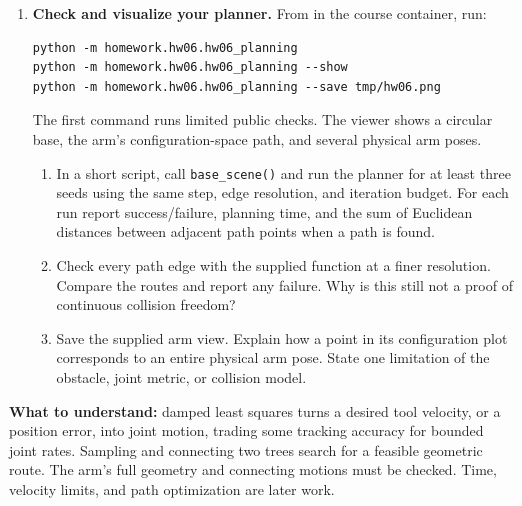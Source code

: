\begin{enumerate}
\item \textbf{Check and visualize your planner.}
From  in the course container, run:
\begin{lstlisting}
python -m homework.hw06.hw06_planning
python -m homework.hw06.hw06_planning --show
python -m homework.hw06.hw06_planning --save tmp/hw06.png
\end{lstlisting}
The first command runs limited public checks. The viewer shows a circular
base, the arm's configuration-space path, and several physical arm poses.
\begin{enumerate}
\item In a short script, call \texttt{base\_scene()} and run the planner for
at least three seeds using the same step, edge resolution, and iteration
budget. For each run report success/failure, planning time, and the sum of
Euclidean distances between adjacent path points when a path is found.
\item Check every path edge with the supplied function at a finer resolution.
Compare the routes and report any failure. Why is this still not a proof of
continuous collision freedom?
\item Save the supplied arm view. Explain how a point in its configuration
plot corresponds to an entire physical arm pose. State one limitation of
the obstacle, joint metric, or collision model.
\end{enumerate}
\end{enumerate}

\textbf{What to understand:} damped least squares turns a desired tool
velocity, or a position error, into joint motion, trading some tracking
accuracy for bounded joint rates. Sampling and connecting two trees search for a
feasible geometric route. The arm's full geometry and connecting motions
must be checked. Time, velocity limits, and path optimization are later work.

\submission

